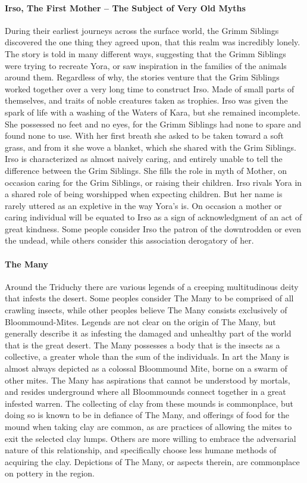 \paragraph{Irso, The First Mother -- The Subject of Very Old Myths}
During their earliest journeys across the surface world, the Grimm Siblings discovered the one thing they agreed upon, that this realm was incredibly lonely. The story is told in many different ways, suggesting that the Grimm Siblings were trying to recreate Yora, or saw inspiration in the families of the animals around them. Regardless of why, the stories venture that the Grim Siblings worked together over a very long time to construct Irso. Made of small parts of themselves, and traits of noble creatures taken as trophies. Irso was given the spark of life with a washing of the Waters of Kara, but she remained incomplete. She possessed no feet and no eyes, for the Grimm Siblings had none to spare and found none to use. With her first breath she asked to be taken toward a soft grass, and from it she wove a blanket, which she shared with the Grim Siblings. Irso is characterized as almost naively caring, and entirely unable to tell the difference between the Grim Siblings. She fills the role in myth of Mother, on occasion caring for the Grim Siblings, or raising their children. Irso rivals Yora in a shared role of being worshipped when expecting children. But her name is rarely uttered as an expletive in the way Yora’s is. On occasion a mother or caring individual will be equated to Irso as a sign of acknowledgment of an act of great kindness. Some people consider Irso the patron of the downtrodden or even the undead, while others consider this association derogatory of her.

\paragraph{The Many}
Around the Triduchy there are various legends of a creeping multitudinous deity that infests the desert. Some peoples consider The Many to be comprised of all crawling insects, while other peoples believe The Many consists exclusively of Bloommound-Mites. Legends are not clear on the origin of The Many, but generally describe it as infesting the damaged and unhealthy part of the world that is the great desert. The Many possesses a body that is the insects as a collective, a greater whole than the sum of the individuals. In art the Many is almost always depicted as a colossal Bloommound Mite, borne on a swarm of other mites. The Many has aspirations that cannot be understood by mortals, and resides underground where all Bloommounds connect together in a great infested warren. The collecting of clay from these mounds is commonplace, but doing so is known to be in defiance of The Many, and offerings of food for the mound when taking clay are common, as are practices of allowing the mites to exit the selected clay lumps. Others are more willing to embrace the adversarial nature of this relationship, and specifically choose less humane methods of acquiring the clay. Depictions of The Many, or aspects therein, are commonplace on pottery in the region.